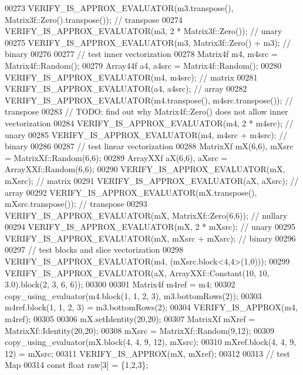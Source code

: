 \begin{DoxyCode}
00273     VERIFY\_IS\_APPROX\_EVALUATOR(m3.transpose(), Matrix3f::Zero().transpose());  \textcolor{comment}{// transpose}
00274     VERIFY\_IS\_APPROX\_EVALUATOR(m3, 2 * Matrix3f::Zero());  \textcolor{comment}{// unary}
00275     VERIFY\_IS\_APPROX\_EVALUATOR(m3, Matrix3f::Zero() + m3);  \textcolor{comment}{// binary  }
00276 
00277     \textcolor{comment}{// test inner vectorization}
00278     Matrix4f m4, m4src = Matrix4f::Random();
00279     Array44f a4, a4src = Matrix4f::Random();
00280     VERIFY\_IS\_APPROX\_EVALUATOR(m4, m4src);  \textcolor{comment}{// matrix}
00281     VERIFY\_IS\_APPROX\_EVALUATOR(a4, a4src);  \textcolor{comment}{// array}
00282     VERIFY\_IS\_APPROX\_EVALUATOR(m4.transpose(), m4src.transpose());  \textcolor{comment}{// transpose}
00283     \textcolor{comment}{// TODO: find out why Matrix4f::Zero() does not allow inner vectorization}
00284     VERIFY\_IS\_APPROX\_EVALUATOR(m4, 2 * m4src);  \textcolor{comment}{// unary}
00285     VERIFY\_IS\_APPROX\_EVALUATOR(m4, m4src + m4src);  \textcolor{comment}{// binary}
00286 
00287     \textcolor{comment}{// test linear vectorization}
00288     MatrixXf mX(6,6), mXsrc = MatrixXf::Random(6,6);
00289     ArrayXXf aX(6,6), aXsrc = ArrayXXf::Random(6,6);
00290     VERIFY\_IS\_APPROX\_EVALUATOR(mX, mXsrc);  \textcolor{comment}{// matrix}
00291     VERIFY\_IS\_APPROX\_EVALUATOR(aX, aXsrc);  \textcolor{comment}{// array}
00292     VERIFY\_IS\_APPROX\_EVALUATOR(mX.transpose(), mXsrc.transpose());  \textcolor{comment}{// transpose}
00293     VERIFY\_IS\_APPROX\_EVALUATOR(mX, MatrixXf::Zero(6,6));  \textcolor{comment}{// nullary}
00294     VERIFY\_IS\_APPROX\_EVALUATOR(mX, 2 * mXsrc);  \textcolor{comment}{// unary}
00295     VERIFY\_IS\_APPROX\_EVALUATOR(mX, mXsrc + mXsrc);  \textcolor{comment}{// binary}
00296 
00297     \textcolor{comment}{// test blocks and slice vectorization}
00298     VERIFY\_IS\_APPROX\_EVALUATOR(m4, (mXsrc.block<4,4>(1,0)));
00299     VERIFY\_IS\_APPROX\_EVALUATOR(aX, ArrayXXf::Constant(10, 10, 3.0).block(2, 3, 6, 6));
00300 
00301     Matrix4f m4ref = m4;
00302     copy\_using\_evaluator(m4.block(1, 1, 2, 3), m3.bottomRows(2));
00303     m4ref.block(1, 1, 2, 3) = m3.bottomRows(2);
00304     VERIFY\_IS\_APPROX(m4, m4ref);
00305 
00306     mX.setIdentity(20,20);
00307     MatrixXf mXref = MatrixXf::Identity(20,20);
00308     mXsrc = MatrixXf::Random(9,12);
00309     copy\_using\_evaluator(mX.block(4, 4, 9, 12), mXsrc);
00310     mXref.block(4, 4, 9, 12) = mXsrc;
00311     VERIFY\_IS\_APPROX(mX, mXref);
00312 
00313     \textcolor{comment}{// test Map}
00314     \textcolor{keyword}{const} \textcolor{keywordtype}{float} raw[3] = \{1,2,3\};

\end{DoxyCode}
